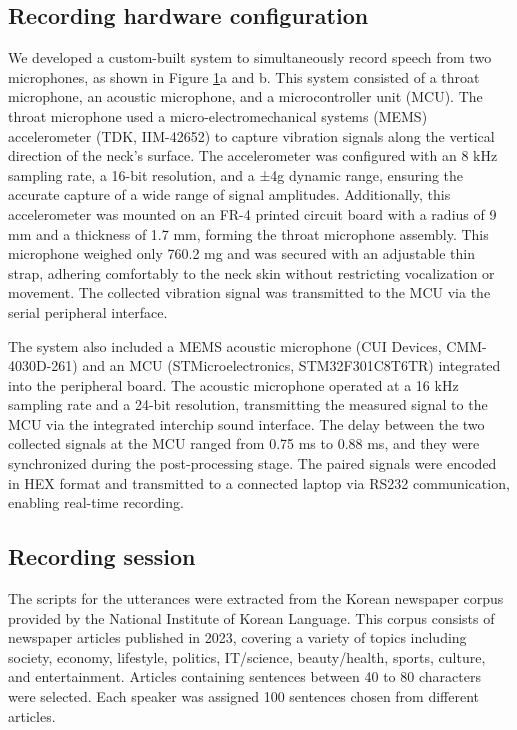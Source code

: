 \documentclass[10pt]{wlscirep}
\begin{document}
\subsection*{Recording hardware configuration}
We developed a custom-built system to simultaneously record speech from two microphones, as shown in Figure \hyperref[fig:1]{1}a and b. This system consisted of a throat microphone, an acoustic microphone, and a microcontroller unit (MCU). The throat microphone used a micro-electromechanical systems (MEMS) accelerometer (TDK, IIM-42652) to capture vibration signals along the vertical direction of the neck’s surface. The accelerometer was configured with an 8 kHz sampling rate, a 16-bit resolution, and a ±4g dynamic range, ensuring the accurate capture of a wide range of signal amplitudes. Additionally, this accelerometer was mounted on an FR-4 printed circuit board with a radius of 9 mm and a thickness of 1.7 mm, forming the throat microphone assembly. This microphone weighed only 760.2 mg and was secured with an adjustable thin strap, adhering comfortably to the neck skin without restricting vocalization or movement. The collected vibration signal was transmitted to the MCU via the serial peripheral interface.

The system also included a MEMS acoustic microphone (CUI Devices, CMM-4030D-261) and an MCU (STMicroelectronics, STM32F301C8T6TR) integrated into the peripheral board. The acoustic microphone operated at a 16 kHz sampling rate and a 24-bit resolution, transmitting the measured signal to the MCU via the integrated interchip sound interface. The delay between the two collected signals at the MCU ranged from 0.75 ms to 0.88 ms, and they were synchronized during the post-processing stage. The paired signals were encoded in HEX format and transmitted to a connected laptop via RS232 communication, enabling real-time recording.

\subsection*{Recording session}
The scripts for the utterances were extracted from the Korean newspaper corpus provided by the National Institute of Korean Language\cite{NIKL2023}. This corpus consists of newspaper articles published in 2023, covering a variety of topics including society, economy, lifestyle, politics, IT/science, beauty/health, sports, culture, and entertainment. Articles containing sentences between 40 to 80 characters were selected. Each speaker was assigned 100 sentences chosen from different articles.
\end{document}
